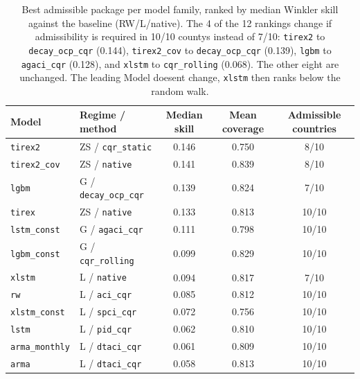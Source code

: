 \begin{table}[t]
\centering
\caption{Best admissible package per model family, ranked
         by median Winkler skill against the baseline (RW/L/native). The 4 of the 12 rankings change if admissibility is required in 10/10 countys instead of 7/10: \texttt{tirex2} to
         \texttt{decay\_ocp\_cqr} (0.144), \texttt{tirex2\_cov} to
         \texttt{decay\_ocp\_cqr} (0.139), \texttt{lgbm} to
         \texttt{agaci\_cqr} (0.128), and \texttt{xlstm} to
         \texttt{cqr\_rolling} (0.068). The other eight are
         unchanged. The leading Model doesent change,
         \texttt{xlstm} then ranks below the random walk.}
\label{tab:res_ranking}
\begin{tabular}{llccc}
\toprule
Model & Regime / method & Median skill & Mean coverage & Admissible countries \\
\midrule
\texttt{tirex2}        & ZS / \texttt{cqr\_static}     & 0.146 & 0.750 & 8/10 \\
\texttt{tirex2\_cov}   & ZS / \texttt{native}          & 0.141 & 0.839 & 8/10 \\
\texttt{lgbm}          & G / \texttt{decay\_ocp\_cqr}  & 0.139 & 0.824 & 7/10 \\
\texttt{tirex}         & ZS / \texttt{native}          & 0.133 & 0.813 & 10/10 \\
\texttt{lstm\_const}   & G / \texttt{agaci\_cqr}       & 0.111 & 0.798 & 10/10 \\
\texttt{lgbm\_const}   & G / \texttt{cqr\_rolling}     & 0.099 & 0.829 & 10/10 \\
\texttt{xlstm}         & L / \texttt{native}           & 0.094 & 0.817 & 7/10 \\
\texttt{rw}            & L / \texttt{aci\_cqr}         & 0.085 & 0.812 & 10/10 \\
\texttt{xlstm\_const}  & L / \texttt{spci\_cqr}        & 0.072 & 0.756 & 10/10 \\
\texttt{lstm}          & L / \texttt{pid\_cqr}         & 0.062 & 0.810 & 10/10 \\
\texttt{arma\_monthly} & L / \texttt{dtaci\_cqr}       & 0.061 & 0.809 & 10/10 \\
\texttt{arma}          & L / \texttt{dtaci\_cqr}       & 0.058 & 0.813 & 10/10 \\
\bottomrule
\end{tabular}
\end{table}

